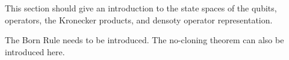 \documentclass{article}
\begin{document}
%
%
%
%
%
%









This section should give an introduction to the state spaces of the qubits, operators, the Kronecker products, and densoty operator representation. 

The Born Rule needs to be introduced. The no-cloning theorem can also be introduced here.



%
%
%
%
\end{document}
